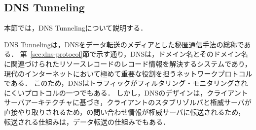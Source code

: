 

\subsection{DNS Tunneling}
\label{sec:dns-tunneling}
本節では，DNS Tunnelingについて説明する．

DNS Tunnelingは，DNSをデータ転送のメディアとした秘匿通信手法の総称である．
第~\ref{sec:dns-protocol}節で示す通り，DNSは，ドメイン名とそのドメイン名に関連づけられたリソースレコードのレコード情報を解決するシステムであり，現代のインターネットにおいて極めて重要な役割を担うネットワークプロトコルである．
このため，DNSはトラフィックがフィルタリング・モニタリングされにくいプロトコルの一つでもある．
しかし，DNSのデザインは，クライアントサーバアーキテクチャに基づき，クライアントのスタブリゾルバと権威サーバが直接やり取りされるため，の問い合わせ情報が権威サーバに転送されるため，
転送される仕組みは，データ転送の仕組みでもある．


